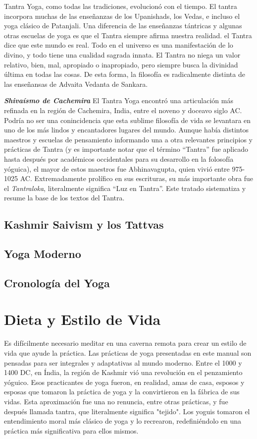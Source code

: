 Tantra Yoga, como todas las tradiciones, evolucionó con el tiempo. El tantra incorpora muchas de las enseñanzas de los Upanishads, los Vedas, e incluso el yoga clásico de Patanjali. Una diferencia de las enseñanzas tántricas y algunas otras escuelas de yoga es que el Tantra siempre afirma nuestra realidad. el Tantra dice que este mundo es real. Todo en el universo es una manifestación de lo divino, y todo tiene una cualidad sagrada innata. El Tantra no niega un valor relativo, bien, mal, apropiado o inapropiado, pero siempre busca la divinidad última en todas las cosas. De esta forma, la filosofía es radicalmente distinta de las enseñansas de Advaita Vedanta de Sankara.

\textbf{\textit{Shivaísmo de Cachemira}}
El Tantra Yoga encontró una articulación más refinada en la región de Cachemira, India, entre el noveno y doceavo siglo AC. Podría no ser una conincidencia que esta sublime filosofía de vida se levantara en uno de los más lindos y encantadores lugares del mundo. Aunque había distintos maestros y escuelas de pensamiento informando una a otra relevantes principios y prácticas de Tantra (y es importante notar que el t\'ermino ``Tantra'' fue aplicado hasta despu\'es por acad\'emicos occidentales para su desarrollo en la folosofía yóguica), el mayor de estos maestros fue Abhinavagupta, quien vivió entre 975-1025 AC. Extremadamente prolífico en sus escrituras, su más importante obra fue el \textit{Tantraloka}, literalmente significa ``Luz en Tantra''. Este tratado sistematiza y resume la base de los textos del Tantra.

\subsection{Kashmir Saivism y los Tattvas}
\subsection{Yoga Moderno}
\subsection{Cronología del Yoga}
\section{Dieta y Estilo de Vida}
Es difícilmente necesario meditar en una caverna remota para crear un estilo de vida que ayude la práctica. Las prácticas de yoga presentadas en este manual son pensadas para ser integrales y adaptativas al mundo moderno. Entre el 1000 y 1400 DC, en Índia, la región de Kashmir vió una revolución en el penzamiento yóguico. Esos practicantes de yoga fueron, en realidad, amas de casa, esposos y esposas que tomaron la práctica de yoga y la convirtieron en la fábrica de sus vidas. Esta aproximación fue una no renuncia, entre otras prácticas, y fue después llamada tantra, que literalmente significa "tejido". Los yoguis tomaron el entendimiento moral más clásico de yoga y lo recrearon, redefiniéndolo en una práctica más significativa para ellos mismos.

